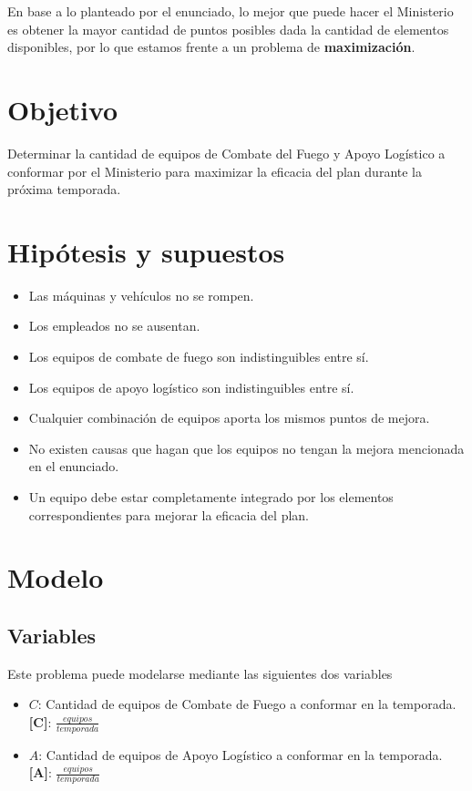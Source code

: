 \documentclass[12pt]{article}
\begin{document}
En base a lo planteado por el enunciado, lo mejor que puede
hacer el Ministerio es obtener la mayor cantidad de puntos posibles
dada la cantidad de elementos disponibles, por
lo que estamos frente a un problema de \textbf{maximización}.

\section{Objetivo}

Determinar la cantidad de equipos de Combate del Fuego y Apoyo
Logístico a conformar por el Ministerio para maximizar la eficacia
del plan durante la próxima temporada.

\section{Hipótesis y supuestos}

\begin{itemize}
\item Las máquinas y vehículos no se rompen.
\item Los empleados no se ausentan.
\item Los equipos de combate de fuego son indistinguibles entre sí.
\item Los equipos de apoyo logístico son indistinguibles entre sí.
\item Cualquier combinación de equipos aporta los mismos puntos de mejora.
\item No existen causas que hagan que los equipos no tengan la mejora mencionada en el enunciado.
\item Un equipo debe estar completamente integrado por los elementos correspondientes para mejorar la eficacia del plan.
\end{itemize}

\section{Modelo}

\subsection{Variables}

Este problema puede modelarse mediante las siguientes dos variables

\begin{itemize}
\item $C$: Cantidad de equipos de Combate de Fuego a conformar en la temporada. \textbf{[C]}: $\frac{equipos}{temporada}$
\item $A$: Cantidad de equipos de Apoyo Logístico a conformar en la temporada. \textbf{[A]}: $\frac{equipos}{temporada}$
\end{itemize}
\end{document}
